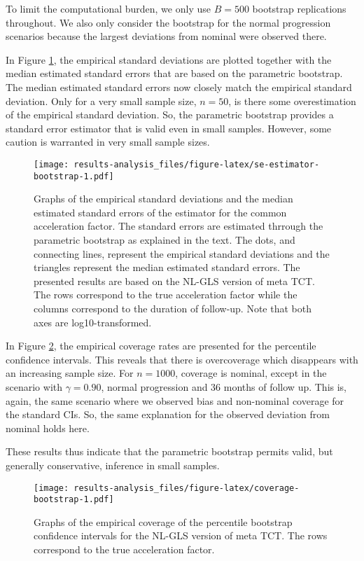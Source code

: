 \documentclass[
]{article}
\begin{document}
To limit the computational burden, we only use \(B = 500\) bootstrap replications
throughout. We also only consider the bootstrap for the normal progression
scenarios because the largest deviations from nominal were observed there.

In Figure \ref{fig:se-estimator-bootstrap}, the empirical standard deviations
are plotted together with the median estimated standard errors that are based on
the parametric bootstrap. The median estimated standard errors now closely match
the empirical standard deviation. Only for a very small sample size, \(n = 50\),
is there some overestimation of the empirical standard deviation. So, the
parametric bootstrap provides a standard error estimator that is valid even in
small samples. However, some caution is warranted in very small sample sizes.

\begin{figure}
\centering
\texttt{[image: results-analysis\_files/figure-latex/se-estimator-bootstrap-1.pdf]}
\caption{\label{fig:se-estimator-bootstrap}Graphs of the empirical standard deviations and the median estimated standard errors of the estimator for the common acceleration factor. The standard errors are estimated thrrough the parametric bootstrap as explained in the text. The dots, and connecting lines, represent the empirical standard deviations and the triangles represent the median estimated standard errors. The presented results are based on the NL-GLS version of meta TCT. The rows correspond to the true acceleration factor while the columns correspond to the duration of follow-up. Note that both axes are log10-transformed.}
\end{figure}

In Figure \ref{fig:coverage-bootstrap}, the empirical coverage rates are
presented for the percentile confidence intervals. This reveals that there is
overcoverage which disappears with an increasing sample size. For \(n = 1000\),
coverage is nominal, except in the scenario with \(\gamma = 0.90\), normal
progression and 36 months of follow up. This is, again, the same scenario where
we observed bias and non-nominal coverage for the standard CIs. So, the same
explanation for the observed deviation from nominal holds here.

These results thus indicate that the parametric bootstrap permits valid, but generally
conservative, inference in small samples.

\begin{figure}
\centering
\texttt{[image: results-analysis\_files/figure-latex/coverage-bootstrap-1.pdf]}
\caption{\label{fig:coverage-bootstrap}Graphs of the empirical coverage of the percentile bootstrap confidence intervals for the NL-GLS version of meta TCT. The rows correspond to the true acceleration factor.}
\end{figure}
\end{document}
